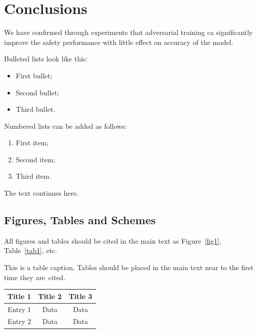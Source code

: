 \documentclass[journal,article,submit,moreauthors,pdftex]{Definitions/mdpi}
\begin{document}
\section{Conclusions}

We have confirmed through experiments that adversarial training ca significantly improve the safety performance with little effect on accuracy of the model.


Bulleted lists look like this:
\begin{itemize}
\item	First bullet;
\item	Second bullet;
\item	Third bullet.
\end{itemize}

Numbered lists can be added as follows:
\begin{enumerate}
\item	First item; 
\item	Second item;
\item	Third item.
\end{enumerate}

The text continues here. 

\subsection{Figures, Tables and Schemes}

All figures and tables should be cited in the main text as Figure~\ref{fig1}, Table~\ref{tab1}, etc.



\begin{specialtable}[H] 
\caption{This is a table caption. Tables should be placed in the main text near to the first time they are~cited.\label{tab1}}
\begin{tabular}{ccc}
\toprule
\textbf{Title 1}	& \textbf{Title 2}	& \textbf{Title 3}\\
\midrule
Entry 1		& Data			& Data\\
Entry 2		& Data			& Data\\
\bottomrule
\end{tabular}
\end{specialtable}

\end{document}
